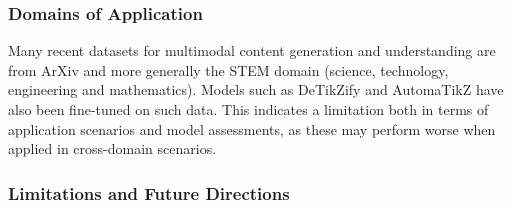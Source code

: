 
\subsubsection{Domains of Application}

Many recent datasets for multimodal content generation and understanding are from ArXiv and more generally the STEM domain (science, technology, engineering and mathematics). Models such as DeTikZify and AutomaTikZ have also been fine-tuned on such data. This indicates a limitation both in terms of application scenarios and model assessments, as these may perform worse when applied in cross-domain scenarios. 


\subsubsection{Limitations and Future Directions}


